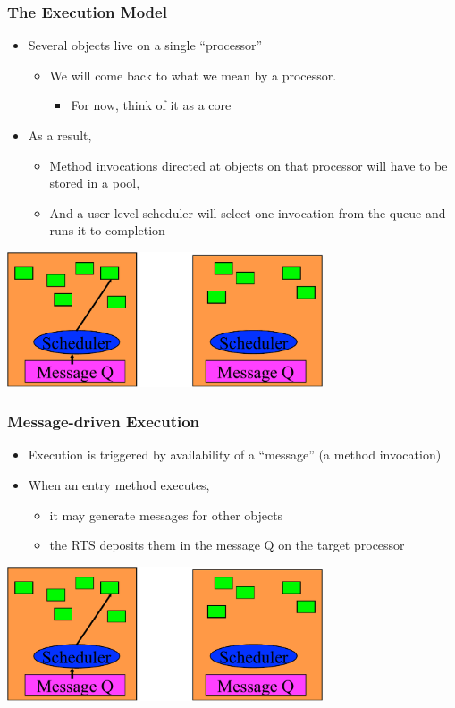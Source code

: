 \begin{frame}[t]
\frametitle{The Execution Model}
  \begin{itemize}
    \item Several objects live on a single ``processor''
    \begin{itemize}
      \item We will come back to what we mean by a processor.
      \begin{itemize}
        \item For now, think of it as a core
      \end{itemize}
    \end{itemize}
  \pause
  \item As a result, 
    \begin{itemize}
      \item Method invocations directed at objects on that processor will have to be stored in a pool,
      \pause
      \item And a user-level scheduler will select one invocation from the queue and runs it to completion
    \end{itemize}
  \end{itemize}
  \begin{center} \includegraphics[width=0.7\textwidth]{figures/scheduler} \end{center}
\end{frame}

\begin{frame}[t]
\frametitle{Message-driven Execution}
  \begin{itemize}
    \item Execution is triggered by availability of a ``message'' (a method invocation)
    \pause
    \item When an entry method executes, 
    \begin{itemize}
      \item it may generate messages for other objects
      \item the RTS deposits them in the message Q on the target processor
    \end{itemize}
  \end{itemize}
  \begin{center} \includegraphics[width=0.7\textwidth]{figures/scheduler} \end{center}
\end{frame}

